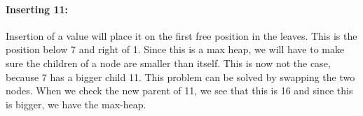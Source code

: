 \documentclass{article}
\begin{document}
\paragraph{Inserting 11:}{
Insertion of a value will place it on the first free position in the leaves. This is the position below 7 and right of 1. Since this is a max heap, we will have to make sure the children of a node are smaller than itself. This is now not the case, because 7 has a bigger child 11. This problem can be solved by swapping the two nodes. When we check the new parent of 11, we see that this is 16 and since this is bigger, we have the max-heap.
    \begin{center}
    \end{center}
}
\
\end{document}
